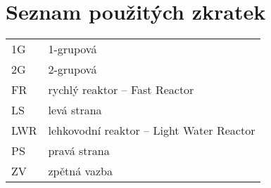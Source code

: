 \section*{Seznam použitých zkratek}

\renewcommand{\arraystretch}{1.2}
\begin{table}[H]
\begin{tabular}{p{1cm}l}
  1G           & 1-grupová \\
  2G           & 2-grupová \\
  FR           & rychlý reaktor -- Fast Reactor \\
  LS           & levá strana \\
  LWR          & lehkovodní reaktor -- Light Water Reactor \\
  PS           & pravá strana \\
  ZV           & zpětná vazba \\
\end{tabular}
\end{table}
\renewcommand{\arraystretch}{1}

